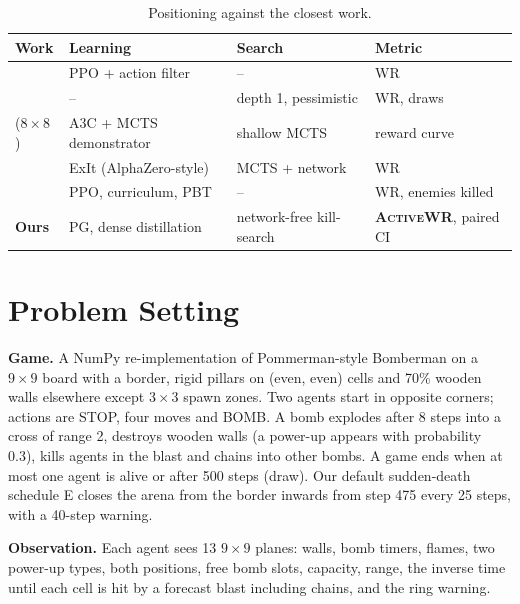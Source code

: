 \documentclass[journal]{IEEEtran}
\newcommand{\awr}{\textsc{ActiveWR}}
\begin{document}
\begin{table}[t]
\centering
\caption{Positioning against the closest work.}
\label{tab:related}
\footnotesize
\setlength{\tabcolsep}{2pt}
\begin{tabular}{@{}L{0.2\columnwidth}L{0.25\columnwidth}L{0.27\columnwidth}L{0.22\columnwidth}@{}}
\toprule
Work & Learning & Search & Metric \\
\midrule
\cite{gao2019skynet,gao2019hard} & PPO + action filter & -- & WR \\
\cite{osogami2019} & -- & depth 1, pessimistic & WR, draws \\
\cite{kartal2018demonstrator,kartal2019guidance} ($8\times8$) & A3C + MCTS demonstrator & shallow MCTS & reward curve \\
\cite{weil2023} & ExIt (AlphaZero-style) & MCTS + network & WR \\
\cite{huynh2024} & PPO, curriculum, PBT & -- & WR, enemies killed \\
\textbf{Ours} & PG, dense distillation & network-free kill-search & \textbf{\awr{}}, paired CI \\
\bottomrule
\end{tabular}
\end{table}

\section{Problem Setting}
\label{sec:setting}

\textbf{Game.} A NumPy re-implementation of Pommerman-style Bomberman on a $9\times9$ board with a border, rigid pillars on (even, even) cells and 70\% wooden walls elsewhere except $3\times3$ spawn zones. Two agents start in opposite corners; actions are STOP, four moves and BOMB. A bomb explodes after 8 steps into a cross of range 2, destroys wooden walls (a power-up appears with probability 0.3), kills agents in the blast and chains into other bombs. A game ends when at most one agent is alive or after 500 steps (draw). Our default sudden-death schedule E closes the arena from the border inwards from step 475 every 25 steps, with a 40-step warning.

\textbf{Observation.} Each agent sees 13 $9\times9$ planes: walls, bomb timers, flames, two power-up types, both positions, free bomb slots, capacity, range, the inverse time until each cell is hit by a forecast blast including chains, and the ring warning.
\end{document}
